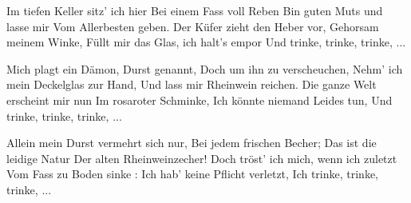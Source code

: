 \footnotemark [
ititle={Im tiefen Keller}]


\beginverse
Im tiefen Keller sitz' ich hier
Bei einem Fass voll Reben
Bin guten Muts und lasse mir
Vom Allerbesten geben.
Der Küfer zieht den Heber vor,
Gehorsam meinem Winke,
Füllt mir das Glas, ich halt's empor
Und trinke, trinke, trinke, ...
\endverse

\beginverse
Mich plagt ein Dämon, Durst genannt,
Doch um ihn zu verscheuchen,
Nehm' ich mein Deckelglas zur Hand,
Und lass mir Rheinwein reichen.
Die ganze Welt erscheint mir nun
Im rosaroter Schminke,
Ich könnte niemand Leides tun,
Und trinke, trinke, trinke, ...
\endverse

\beginverse
Allein mein Durst vermehrt sich nur,
Bei jedem frischen Becher;
Das ist die leidige Natur
Der alten Rheinweinzecher!
Doch tröst' ich mich, wenn ich zuletzt
Vom Fass zu Boden sinke :
Ich hab' keine Pflicht verletzt,
Ich trinke, trinke, trinke, ...
\endverse
\endsong
